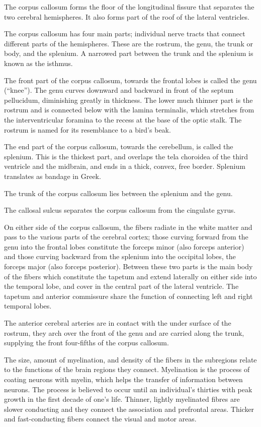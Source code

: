 \documentclass[]{book}
\begin{document}
The corpus callosum forms the floor of the longitudinal fissure that separates the two cerebral hemispheres. It also forms part of the roof of the lateral ventricles.

The corpus callosum has four main parts; individual nerve tracts that connect different parts of the hemispheres. These are the rostrum, the genu, the trunk or body, and the splenium. A narrowed part between the trunk and the splenium is known as the isthmus.

The front part of the corpus callosum, towards the frontal lobes is called the genu (``knee''). The genu curves downward and backward in front of the septum pellucidum, diminishing greatly in thickness. The lower much thinner part is the rostrum and is connected below with the lamina terminalis, which stretches from the interventricular foramina to the recess at the base of the optic stalk. The rostrum is named for its resemblance to a bird's beak.

The end part of the corpus callosum, towards the cerebellum, is called the splenium. This is the thickest part, and overlaps the tela choroidea of the third ventricle and the midbrain, and ends in a thick, convex, free border. Splenium translates as bandage in Greek.

The trunk of the corpus callosum lies between the splenium and the genu.

The callosal sulcus separates the corpus callosum from the cingulate gyrus.

On either side of the corpus callosum, the fibers radiate in the white matter and pass to the various parts of the cerebral cortex; those curving forward from the genu into the frontal lobes constitute the forceps minor (also forceps anterior) and those curving backward from the splenium into the occipital lobes, the forceps major (also forceps posterior). Between these two parts is the main body of the fibers which constitute the tapetum and extend laterally on either side into the temporal lobe, and cover in the central part of the lateral ventricle. The tapetum and anterior commissure share the function of connecting left and right temporal lobes.

The anterior cerebral arteries are in contact with the under surface of the rostrum, they arch over the front of the genu and are carried along the trunk, supplying the front four-fifths of the corpus callosum.

The size, amount of myelination, and density of the fibers in the subregions relate to the functions of the brain regions they connect. Myelination is the process of coating neurons with myelin, which helps the transfer of information between neurons. The process is believed to occur until an individual's thirties with peak growth in the first decade of one's life. Thinner, lightly myelinated fibres are slower conducting and they connect the association and prefrontal areas. Thicker and fast-conducting fibers connect the visual and motor areas.
\end{document}
